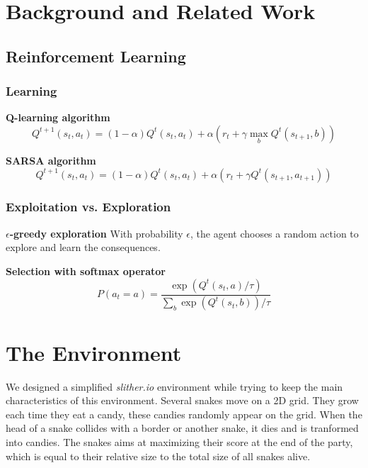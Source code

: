 \documentclass[journal, a4paper]{IEEEtran}
\begin{document}
\section{Background and Related Work}

\subsection{Reinforcement Learning}


\subsubsection{Learning}

\textbf{Q-learning algorithm}
\cite{lecture-rl}
\cite{lecture-rl2}
\cite{intro-rl}
\cite{qlearning}
\[
	Q^{t+1}(s_t, a_t) = (1-\alpha) Q^t(s_t, a_t) + \alpha (r_t + \gamma \max\limits_b Q^t(s_{t+1}, b))
\]

\textbf{SARSA algorithm}
\cite{lecture-rl}
\cite{lecture-rl2}
\cite{intro-rl}
\cite{sarsa}
\[
	Q^{t+1}(s_t, a_t) = (1-\alpha) Q^t(s_t, a_t) + \alpha (r_t + \gamma Q^t(s_{t+1}, a_{t+1}))
\]

\subsubsection{Exploitation vs. Exploration}

\textbf{$\epsilon$-greedy exploration}
\cite{lecture-rl}
\cite{lecture-rl2}
\cite{intro-rl}
With probability $\epsilon$, the agent chooses a random action to explore and learn the consequences.

\textbf{Selection with softmax operator}
\cite{intro-rl}
\[
    P\left(a_t = a\right) = \frac{\exp\left(Q^t(s_t, a) / \tau\right)}{\sum\limits_b \exp\left(Q^t(s_t, b)\right) / \tau}
\]



\section{The Environment}
We designed a simplified \emph{slither.io} environment while trying to keep the main characteristics of this environment. Several snakes move on a 2D grid. They grow each time they eat a candy, these candies randomly appear on the grid. When the head of a snake collides with a border or another snake, it dies and is tranformed into candies. The snakes aims at maximizing their score at the end of the party, which is equal to their relative size to the total size of all snakes alive.
\end{document}
